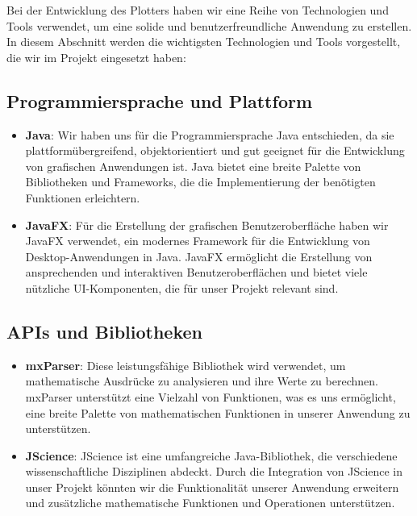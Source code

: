 \documentclass[a4paper]{article}
\begin{document}
Bei der Entwicklung des Plotters haben wir eine Reihe von Technologien und Tools verwendet, um eine solide und benutzerfreundliche Anwendung zu erstellen. In diesem Abschnitt werden die wichtigsten Technologien und Tools vorgestellt, die wir im Projekt eingesetzt haben:

\subsection{Programmiersprache und Plattform}

\begin{itemize}
	\item \textbf{Java}: Wir haben uns für die Programmiersprache Java entschieden, da sie plattformübergreifend, objektorientiert und gut geeignet für die Entwicklung von grafischen Anwendungen ist. Java bietet eine breite Palette von Bibliotheken und Frameworks, die die Implementierung der benötigten Funktionen erleichtern.

	\item \textbf{JavaFX}: Für die Erstellung der grafischen Benutzeroberfläche haben wir JavaFX verwendet, ein modernes Framework für die Entwicklung von Desktop-Anwendungen in Java. JavaFX ermöglicht die Erstellung von ansprechenden und interaktiven Benutzeroberflächen und bietet viele nützliche UI-Komponenten, die für unser Projekt relevant sind.
\end{itemize}

\subsection{APIs und Bibliotheken}

\begin{itemize}
	\item \textbf{mxParser}: Diese leistungsfähige Bibliothek wird verwendet, um mathematische Ausdrücke zu analysieren und ihre Werte zu berechnen. mxParser unterstützt eine Vielzahl von Funktionen, was es uns ermöglicht, eine breite Palette von mathematischen Funktionen in unserer Anwendung zu unterstützen.

	\item \textbf{JScience}: JScience ist eine umfangreiche Java-Bibliothek, die verschiedene wissenschaftliche Disziplinen abdeckt. Durch die Integration von JScience in unser Projekt könnten wir die Funktionalität unserer Anwendung erweitern und zusätzliche mathematische Funktionen und Operationen unterstützen.
\end{itemize}
\end{document}
